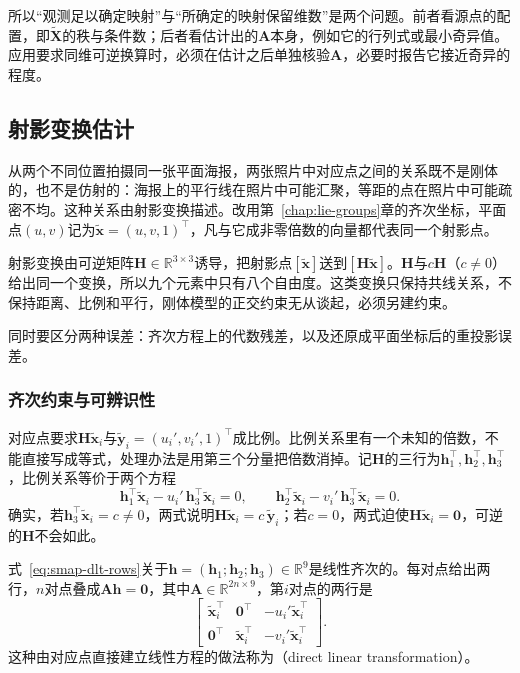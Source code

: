 所以“观测足以确定映射”与“所确定的映射保留维数”是两个问题。前者看源点的配置，即$\widetilde{\bm X}$的秩与条件数；后者看估计出的$\bm A$本身，例如它的行列式或最小奇异值。应用要求同维可逆换算时，必须在估计之后单独核验$\bm A$，必要时报告它接近奇异的程度。

\subsection{射影变换估计}
\label{sec:smap-projective}

从两个不同位置拍摄同一张平面海报，两张照片中对应点之间的关系既不是刚体的，也不是仿射的：海报上的平行线在照片中可能汇聚，等距的点在照片中可能疏密不均。这种关系由射影变换描述。改用第~\ref{chap:lie-groups}章的齐次坐标，平面点$(u,v)$记为$\widetilde{\bm x}=(u,v,1)^\top$，凡与它成非零倍数的向量都代表同一个射影点。

射影变换由可逆矩阵$\bm H\in\mathbb R^{3\times3}$诱导，把射影点$[\widetilde{\bm x}]$送到$[\bm H\widetilde{\bm x}]$。$\bm H$与$c\bm H$（$c\neq0$）给出同一个变换，所以九个元素中只有八个自由度。这类变换只保持共线关系，不保持距离、比例和平行，刚体模型的正交约束无从谈起，必须另建约束。

同时要区分两种误差：齐次方程上的代数残差，以及还原成平面坐标后的重投影误差。

\subsubsection{齐次约束与可辨识性}
\label{sec:smap-homogeneous-constraints}

对应点要求$\bm H\widetilde{\bm x}_i$与$\widetilde{\bm y}_i=(u_i',v_i',1)^\top$成比例。比例关系里有一个未知的倍数，不能直接写成等式，处理办法是用第三个分量把倍数消掉。记$\bm H$的三行为$\bm h_1^\top,\bm h_2^\top,\bm h_3^\top$，比例关系等价于两个方程
\begin{equation}
 \bm h_1^\top\widetilde{\bm x}_i-u_i'\,\bm h_3^\top\widetilde{\bm x}_i=0,\qquad
 \bm h_2^\top\widetilde{\bm x}_i-v_i'\,\bm h_3^\top\widetilde{\bm x}_i=0 .
 \label{eq:smap-dlt-rows}
\end{equation}
确实，若$\bm h_3^\top\widetilde{\bm x}_i=c\neq0$，两式说明$\bm H\widetilde{\bm x}_i=c\,\widetilde{\bm y}_i$；若$c=0$，两式迫使$\bm H\widetilde{\bm x}_i=\bm0$，可逆的$\bm H$不会如此。

式~\eqref{eq:smap-dlt-rows}关于$\bm h=(\bm h_1;\bm h_2;\bm h_3)\in\mathbb R^9$是线性齐次的。每对点给出两行，$n$对点叠成$\bm A\bm h=\bm0$，其中$\bm A\in\mathbb R^{2n\times9}$，第$i$对点的两行是
\begin{equation}
 \begin{bmatrix}
 \widetilde{\bm x}_i^\top&\bm0^\top&-u_i'\widetilde{\bm x}_i^\top\\
 \bm0^\top&\widetilde{\bm x}_i^\top&-v_i'\widetilde{\bm x}_i^\top
 \end{bmatrix}.
 \label{eq:smap-dlt-matrix}
\end{equation}
这种由对应点直接建立线性方程的做法称为（direct linear transformation）。

